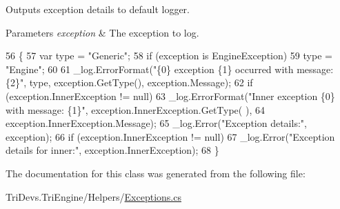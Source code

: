 Outputs exception details to default logger. 


\begin{DoxyParams}{Parameters}
{\em exception} & The exception to log.\\
\hline
\end{DoxyParams}

\begin{DoxyCode}
56         \{
57             var type = \textcolor{stringliteral}{"Generic"};
58             \textcolor{keywordflow}{if} (exception is EngineException)
59                 type = \textcolor{stringliteral}{"Engine"};
60 
61             \_log.ErrorFormat(\textcolor{stringliteral}{"\{0\} exception \{1\} occurred with message: \{2\}"}, type, exception.GetType(), 
      exception.Message);
62             \textcolor{keywordflow}{if} (exception.InnerException != null)
63                 \_log.ErrorFormat(\textcolor{stringliteral}{"Inner exception \{0\} with message: \{1\}"}, exception.InnerException.GetType(
      ),
64                                  exception.InnerException.Message);
65             \_log.Error(\textcolor{stringliteral}{"Exception details:"}, exception);
66             \textcolor{keywordflow}{if} (exception.InnerException != null)
67                 \_log.Error(\textcolor{stringliteral}{"Exception details for inner:"}, exception.InnerException);
68         \}
\end{DoxyCode}


The documentation for this class was generated from the following file\-:\begin{DoxyCompactItemize}
\item 
Tri\-Devs.\-Tri\-Engine/\-Helpers/\hyperlink{_exceptions_8cs}{Exceptions.\-cs}\end{DoxyCompactItemize}
